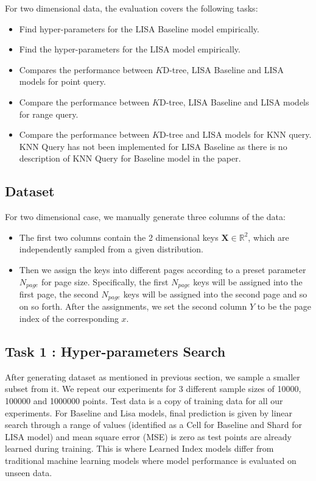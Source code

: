 For two dimensional data, the evaluation covers the following tasks:

\begin{itemize}
 	\item Find hyper-parameters for the LISA Baseline model empirically.
	\item Find the hyper-parameters for the LISA model empirically.
	\item Compares the performance between $K$D-tree, LISA Baseline and LISA models for point query.
	\item Compare the performance between $K$D-tree, LISA Baseline and LISA models for range query.
	\item Compare the performance between $K$D-tree and LISA models for KNN query. KNN Query has not been implemented for LISA Baseline as there is no description of KNN Query for Baseline model in the paper. 
\end{itemize}

\subsection{Dataset}

For two dimensional case, we manually generate three columns of the data:

\begin{itemize}
	\item The first two columns contain the  2 dimensional keys $\boldsymbol{X} \in \mathbb{R}^{2}$, which are independently sampled from a given distribution. %
	\item Then we assign the keys into different pages according to a preset parameter $N_{page}$ for page size. Specifically, the first $N_{page}$ keys will be assigned into the first page, the second $N_{page}$ keys will be assigned into the second page and so on so forth. After the assignments, we set the second column $Y$ to be the page index of the corresponding $x$.
\end{itemize}

\subsection{Task 1 : Hyper-parameters Search }
After generating dataset as mentioned in previous section, we sample a smaller subset from it. We repeat our experiments for 3 different sample sizes of 10000, 100000 and 1000000 points. Test data is a copy of training data for all our experiments. For Baseline and Lisa models, final prediction is given by linear search through a range of values (identified as a Cell for Baseline and Shard for LISA model) and mean square error (MSE) is zero as test points are already learned during training. This is where Learned Index models differ from traditional machine learning models where model performance is evaluated on unseen data. 

